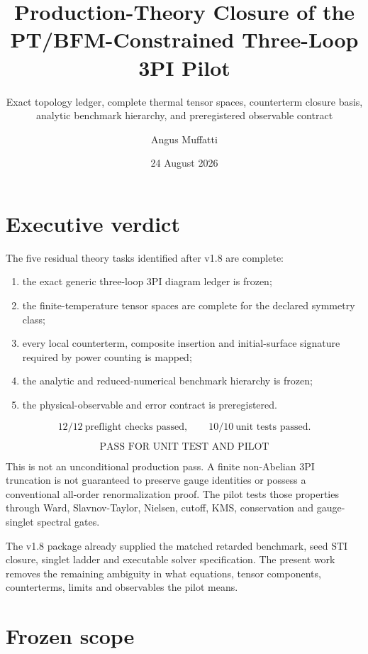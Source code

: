 \documentclass[
  10pt,
]{article}
\title{Production-Theory Closure of the PT/BFM-Constrained Three-Loop
3PI Pilot}
\subtitle{Exact topology ledger, complete thermal tensor spaces,
counterterm closure basis, analytic benchmark hierarchy, and
preregistered observable contract}
\author{Angus Muffatti}
\date{24 August 2026}
\providecommand{\tightlist}{%
  \setlength{\itemsep}{0pt}\setlength{\parskip}{0pt}}
\begin{document}
\maketitle

{
\hypersetup{linkcolor=}
\setcounter{tocdepth}{3}
\tableofcontents
}
\section{Executive verdict}\label{executive-verdict}

The five residual theory tasks identified after v1.8 are complete:

\begin{enumerate}
\def\labelenumi{\arabic{enumi}.}
\tightlist
\item
  the exact generic three-loop 3PI diagram ledger is frozen;
\item
  the finite-temperature tensor spaces are complete for the declared
  symmetry class;
\item
  every local counterterm, composite insertion and initial-surface
  signature required by power counting is mapped;
\item
  the analytic and reduced-numerical benchmark hierarchy is frozen;
\item
  the physical-observable and error contract is preregistered.
\end{enumerate}

\[
\boxed{12/12\ \text{preflight checks passed}},
\qquad
\boxed{10/10\ \text{unit tests passed}}.
\]

\[
\boxed{\text{PASS FOR UNIT TEST AND PILOT}}
\]

This is not an unconditional production pass. A finite non-Abelian 3PI
truncation is not guaranteed to preserve gauge identities or possess a
conventional all-order renormalization proof. The pilot tests those
properties through Ward, Slavnov-Taylor, Nielsen, cutoff, KMS,
conservation and gauge-singlet spectral gates.

The v1.8 package already supplied the matched retarded benchmark, seed
STI closure, singlet ladder and executable solver specification. The
present work removes the remaining ambiguity in what equations, tensor
components, counterterms, limits and observables the pilot means.

\section{Frozen scope}\label{frozen-scope}
\end{document}
